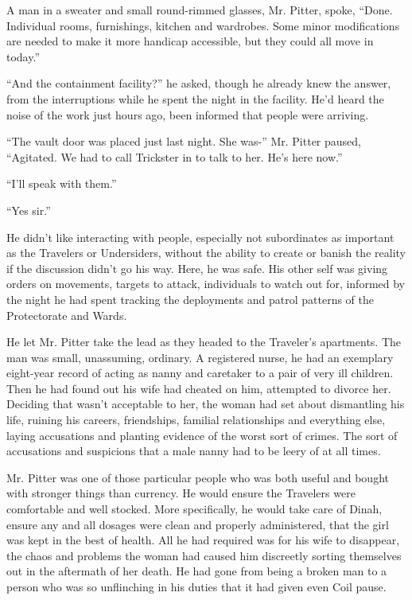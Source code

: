 A man in a sweater and small round-rimmed glasses, Mr. Pitter, spoke, ``Done.  Individual rooms, furnishings, kitchen and wardrobes.  Some minor modifications are needed to make it more handicap accessible, but they could all move in today.''



``And the containment facility?'' he asked, though he already knew the answer, from the interruptions while he spent the night in the facility.  He'd heard the noise of the work just hours ago, been informed that people were arriving.



``The vault door was placed just last night.  She was-'' Mr. Pitter paused, ``Agitated.  We had to call Trickster in to talk to her.  He's here now.''



``I'll speak with them.''



``Yes sir.''



He didn't like interacting with people, especially not subordinates as important as the Travelers or Undersiders, without the ability to create or banish the reality if the discussion didn't go his way.  Here, he was safe.  His other self was giving orders on movements, targets to attack, individuals to watch out for, informed by the night he had spent tracking the deployments and patrol patterns of the Protectorate and Wards.



He let Mr. Pitter take the lead as they headed to the Traveler's apartments.  The man was small, unassuming, ordinary.  A registered nurse, he had an exemplary eight-year record of acting as nanny and caretaker to a pair of very ill children.  Then he had found out his wife had cheated on him, attempted to divorce her.  Deciding that wasn't acceptable to her, the woman had set about dismantling his life, ruining his careers, friendships, familial relationships and everything else, laying accusations and planting evidence of the worst sort of crimes.  The sort of accusations and suspicions that a male nanny had to be leery of at all times.



Mr. Pitter was one of those particular people who was both useful and bought with stronger things than currency.  He would ensure the Travelers were comfortable and well stocked.  More specifically, he would take care of Dinah, ensure any and all dosages were clean and properly administered, that the girl was kept in the best of health.  All he had required was for his wife to disappear, the chaos and problems the woman had caused him discreetly sorting themselves out in the aftermath of her death.  He had gone from being a broken man to a person who was so unflinching in his duties that it had given even Coil pause.



